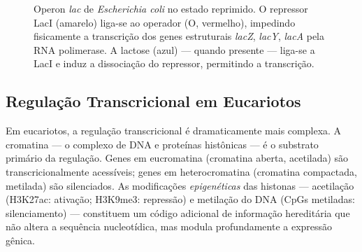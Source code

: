 \begin{figure}[htbp]
\centering
{}
\caption{Operon \textit{lac} de \textit{Escherichia coli} no estado reprimido. O repressor LacI (amarelo) liga-se ao operador (O, vermelho), impedindo fisicamente a transcrição dos genes estruturais \textit{lacZ}, \textit{lacY}, \textit{lacA} pela RNA polimerase. A lactose (azul) --- quando presente --- liga-se a LacI e induz a dissociação do repressor, permitindo a transcrição.}
\label{fig:06-operon}
\end{figure}

\subsection{Regulação Transcricional em Eucariotos}

Em eucariotos, a regulação transcricional é dramaticamente mais complexa. A cromatina ---
o complexo de DNA e proteínas histônicas --- é o substrato primário da regulação. Genes em
eucromatina (cromatina aberta, acetilada) são transcricionalmente acessíveis; genes em
heterocromatina (cromatina compactada, metilada) são silenciados. As modificações
\emph{epigenéticas} das histonas --- acetilação (H3K27ac: ativação; H3K9me3: repressão) e
metilação do DNA (CpGs metiladas: silenciamento) --- constituem um código adicional de
informação hereditária que não altera a sequência nucleotídica, mas modula
profundamente a expressão gênica.

